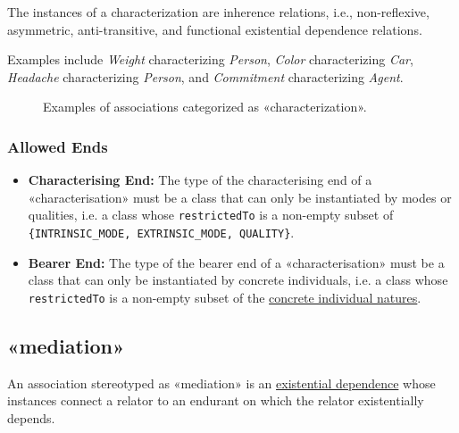 The instances of a characterization are inherence relations, i.e., non-reflexive, asymmetric, anti-transitive, and functional existential dependence relations.

Examples include \textit{Weight} characterizing \textit{Person}, \textit{Color} characterizing \textit{Car}, \textit{Headache} characterizing \textit{Person}, and \textit{Commitment} characterizing \textit{Agent}.

\begin{figure}[h]
    \centering
    
    \caption{Examples of associations categorized as «characterization».}
    \label{fig:characterization-example}
\end{figure}

\subsubsection{Allowed Ends}

\begin{itemize}
    \item \textbf{Characterising End:} The type of the characterising end of a «characterisation» must be a class that can only be instantiated by modes or qualities, i.e. a class whose \texttt{restrictedTo} is a non-empty subset of \texttt{\{INTRINSIC\_MODE, EXTRINSIC\_MODE, QUALITY\}}.
    \item \textbf{Bearer End:} The type of the bearer end of a «characterisation» must be a class that can only be instantiated by concrete individuals, i.e. a class whose  \texttt{restrictedTo} is a non-empty subset of the \hyperref[par:concrete-individual-nature]{concrete individual natures}.
\end{itemize}





\subsection{«mediation»}
\label{stereotype:mediation}

An association stereotyped as «mediation» is an \hyperref[stereotype:existential-dependence]{existential dependence} whose instances connect a relator to an endurant on which the relator existentially depends.

